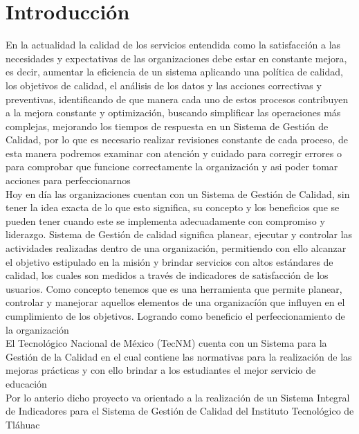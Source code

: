 \chapter{Introducci\'on}
	En la actualidad la calidad de los servicios entendida como la satisfacci\'on a las necesidades 
	y expectativas de las organizaciones debe estar en constante mejora, es decir, aumentar la eficiencia 
	de un sistema aplicando una pol\'itica de calidad, los objetivos de calidad, el an\'alisis de los datos y 
	las acciones correctivas y preventivas, identificando de que manera cada uno de estos procesos
	contribuyen a la mejora constante y optimizaci\'on, buscando simplificar las operaciones m\'as complejas, 
	mejorando los tiempos de respuesta en un Sistema de Gesti\'on de Calidad, por lo que es necesario realizar 
	revisiones constante de cada proceso, de esta manera podremos examinar con atenci\'on y cuidado para corregir 
	errores o para comprobar que funcione correctamente la organizaci\'on y asi poder tomar acciones para perfeccionarnos\\

	Hoy en d\'ia las organizaciones cuentan con un Sistema de Gesti\'on de Calidad, sin tener la idea exacta de lo que esto significa, su concepto y los beneficios que se pueden tener cuando este se implementa adecuadamente con compromiso y liderazgo. Sistema de Gesti\'on de calidad significa planear, ejecutar y controlar las actividades realizadas dentro de una organizaci\'on, permitiendo con ello alcanzar el objetivo estipulado en la misi\'on y brindar servicios con altos est\'andares de calidad, los cuales son medidos a trav\'es de indicadores de satisfacci\'on de los usuarios. Como concepto tenemos que es una herramienta que permite planear, controlar y manejorar aquellos elementos de una organizac\'i\'on que influyen en el cumplimiento de los objetivos. Logrando como beneficio el perfeccionamiento de la organizaci\'on\\

	El Tecnol\'ogico Nacional de M\'exico (TecNM) cuenta con un Sistema para  la Gesti\'on de la Calidad en el cual contiene las normativas para la realizaci\'on de las mejoras pr\'acticas y con ello brindar a los estudiantes el mejor servicio de educaci\'on\\

	Por lo anterio dicho proyecto va orientado a la realizaci\'on de un Sistema Integral de Indicadores para el Sistema de Gesti\'on de Calidad del Instituto Tecnol\'ogico de Tl\'ahuac\\

